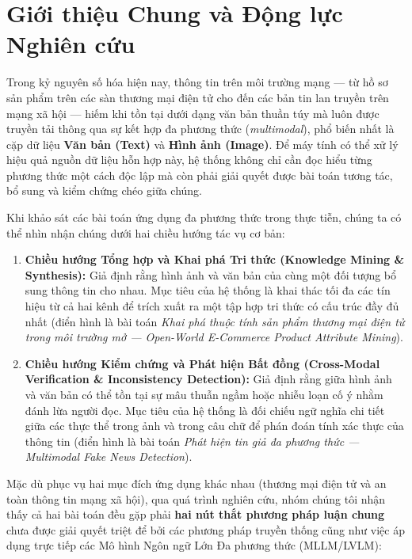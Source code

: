 \documentclass[conference,10pt]{IEEEtran}
\begin{document}
\section{Giới thiệu Chung và Động lực Nghiên cứu}

Trong kỷ nguyên số hóa hiện nay, thông tin trên môi trường mạng --- từ hồ sơ sản phẩm trên các sàn thương mại điện tử cho đến các bản tin lan truyền trên mạng xã hội --- hiếm khi tồn tại dưới dạng văn bản thuần túy mà luôn được truyền tải thông qua sự kết hợp đa phương thức (\textit{multimodal}), phổ biến nhất là cặp dữ liệu \textbf{Văn bản (Text)} và \textbf{Hình ảnh (Image)}. Để máy tính có thể xử lý hiệu quả nguồn dữ liệu hỗn hợp này, hệ thống không chỉ cần đọc hiểu từng phương thức một cách độc lập mà còn phải giải quyết được bài toán tương tác, bổ sung và kiểm chứng chéo giữa chúng.

Khi khảo sát các bài toán ứng dụng đa phương thức trong thực tiễn, chúng ta có thể nhìn nhận chúng dưới hai chiều hướng tác vụ cơ bản:
\begin{enumerate}
    \item \textbf{Chiều hướng Tổng hợp và Khai phá Tri thức (Knowledge Mining \& Synthesis):} Giả định rằng hình ảnh và văn bản của cùng một đối tượng bổ sung thông tin cho nhau. Mục tiêu của hệ thống là khai thác tối đa các tín hiệu từ cả hai kênh để trích xuất ra một tập hợp tri thức có cấu trúc đầy đủ nhất (điển hình là bài toán \textit{Khai phá thuộc tính sản phẩm thương mại điện tử trong môi trường mở --- Open-World E-Commerce Product Attribute Mining}).
    \item \textbf{Chiều hướng Kiểm chứng và Phát hiện Bất đồng (Cross-Modal Verification \& Inconsistency Detection):} Giả định rằng giữa hình ảnh và văn bản có thể tồn tại sự mâu thuẫn ngầm hoặc nhiễu loạn cố ý nhằm đánh lừa người đọc. Mục tiêu của hệ thống là đối chiếu ngữ nghĩa chi tiết giữa các thực thể trong ảnh và trong câu chữ để phán đoán tính xác thực của thông tin (điển hình là bài toán \textit{Phát hiện tin giả đa phương thức --- Multimodal Fake News Detection}).
\end{enumerate}

Mặc dù phục vụ hai mục đích ứng dụng khác nhau (thương mại điện tử và an toàn thông tin mạng xã hội), qua quá trình nghiên cứu, nhóm chúng tôi nhận thấy cả hai bài toán đều gặp phải \textbf{hai nút thắt phương pháp luận chung} chưa được giải quyết triệt để bởi các phương pháp truyền thống cũng như việc áp dụng trực tiếp các Mô hình Ngôn ngữ Lớn Đa phương thức (MLLM/LVLM):
\end{document}
